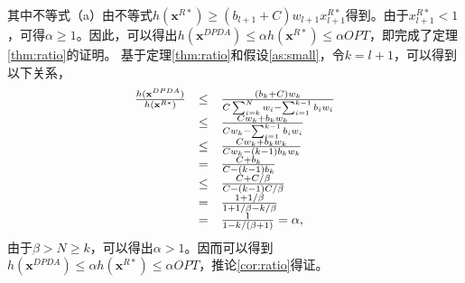 	其中不等式（a）由不等式$h(\mathbf{x}^{R*})\ge (b_{l+1}+C)w_{l+1}x_{l+1}^{R*}$得到。由于$x_{l+1}^{R*}<1$，可得$\alpha\geq 1$。因此，可以得出$h(\mathbf{x}^{DPDA})\leq\alpha h(\mathbf{x}^{R*})\leq \alpha OPT$，即完成了定理\ref{thm:ratio}的证明。	
	基于定理\ref{thm:ratio}和假设\ref{as:small}，令$k=l+1$，可以得到以下关系，
	\begin{equation}%
	\hspace{-0.0cm}
	\begin{array}
	[c]{lll}%
	\frac{h(\mathbf{x}^{DPDA})}{h(\mathbf{x}^{R*})}
	&\leq&\frac{(b_{k}+C)w_{k}}{C\sum_{i=k}^N w_i-\sum_{i=1}^{k-1} b_iw_i}\\
	&\leq& \frac{Cw_{k}+b_kw_k}{C w_k-\sum_{i=1}^{k-1} b_iw_i}\\
	&\leq& \frac{Cw_{k}+b_kw_k}{C w_k-(k-1)b_kw_k}\\
	&=& \frac{C+b_k}{C-(k-1)b_k}\\
	&\leq&\frac{C+C/\beta}{C-(k-1)C/\beta}\\
	&=&\frac{1+1/\beta}{1+1/\beta-k/\beta}\\
	&=&\frac{1}{1-k/(\beta+1)}=\alpha,
	\end{array}
	\label{eq:h}
	\end{equation}
	由于$\beta>N\geq k$，可以得出$\alpha > 1$。因而可以得到$h(\mathbf{x}^{DPDA})\leq \alpha h(\mathbf{x}^{R*})\leq \alpha OPT$，推论\ref{cor:ratio}得证。



